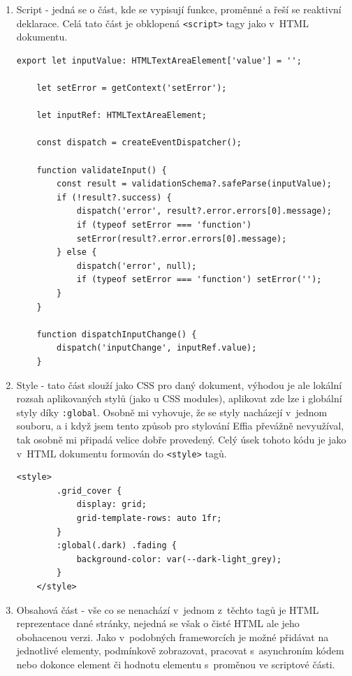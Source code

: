 \documentclass[12pt, a4paper,
openright
]{report}
\begin{document}
\begin{enumerate}
	\item Script - jedná se o část, kde se vypisují funkce, proměnné a řeší se reaktivní deklarace. Celá tato část je obklopená \texttt{<script>} tagy jako v~HTML dokumentu.
	\begin{lstlisting}[style=ES6, caption=Ukázka Svelte kódu ve script tagu, label=svelte-script-sample]
	export let inputValue: HTMLTextAreaElement['value'] = '';
	
	let setError = getContext('setError');
	
	let inputRef: HTMLTextAreaElement;
	
	const dispatch = createEventDispatcher();
	
	function validateInput() {
		const result = validationSchema?.safeParse(inputValue);
		if (!result?.success) {
			dispatch('error', result?.error.errors[0].message);
			if (typeof setError === 'function')
			setError(result?.error.errors[0].message);
		} else {
			dispatch('error', null);
			if (typeof setError === 'function') setError('');
		}
	}
	
	function dispatchInputChange() {
		dispatch('inputChange', inputRef.value);
	}
	\end{lstlisting}
	\item Style - tato část slouží jako CSS pro daný dokument, výhodou je ale lokální rozsah aplikovaných stylů (jako u CSS modules), aplikovat zde lze i globální styly díky \texttt{:global}. Osobně mi vyhovuje, že se styly nacházejí v~jednom souboru, a i když jsem tento způsob pro stylování Effia převážně nevyužíval, tak osobně mi připadá velice dobře provedený. Celý úsek tohoto kódu je jako v~HTML dokumentu formován do \texttt{<style>} tagů.
	
	\begin{lstlisting}[style=ES6, caption=Ukázka Svelte CSS kódu, label=svelte-CSS-sample]
	<style>
		.grid_cover {
			display: grid;
			grid-template-rows: auto 1fr;
		}
		:global(.dark) .fading {
			background-color: var(--dark-light_grey);
		}
	</style>
	\end{lstlisting}
	\item Obsahová část - vše co se nenachází v~jednom z~těchto tagů je HTML reprezentace dané stránky, nejedná se však o čisté HTML ale jeho obohacenou verzi. Jako v~podobných frameworcích je možné přidávat  na jednotlivé elementy, podmínkově zobrazovat, pracovat s~asynchroním kódem nebo dokonce  element či hodnotu elementu s~proměnou ve scriptové části.
	

\end{enumerate}
\end{document}

